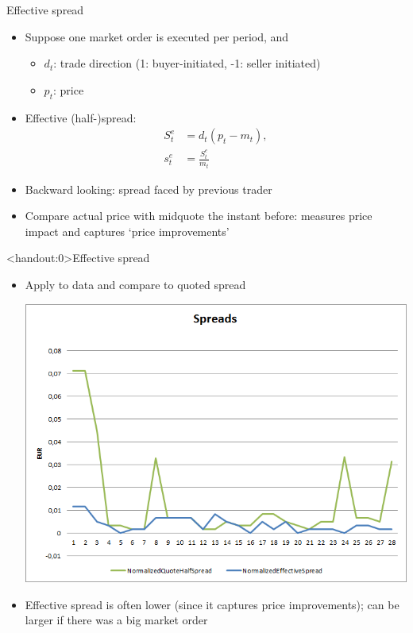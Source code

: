 \documentclass[english,10pt
,aspectratio=169
]{beamer}
\begin{document}
\begin{frame}{Effective spread}
	\begin{itemize}
		\item Suppose one market order is executed per period, and
		\begin{itemize}
			\item $d_t$: trade direction (1: buyer-initiated, -1: seller initiated)
			\item $p_t$:  price
		\end{itemize}
		\item \alert{Effective (half-)spread}: 
		\begin{align*}
		S^e_t & = d_t(p_t-m_{t}), \\
		s^e_t & = \frac{S^e_t}{m_{t}}
		\end{align*}
		\item Backward looking: spread faced by previous trader
		\item Compare actual price with midquote the instant before: measures price impact and captures `price improvements'
	\end{itemize}
\end{frame}


\begin{frame}<handout:0>{Effective spread}
	\begin{itemize}
		\item Apply to data and compare to quoted spread
		\begin{center}
			\includegraphics[scale=0.39]{pics/L2_effectivespread}
		\end{center}
		\item Effective spread is often lower (since it captures price improvements); can be larger if there was a big market order
	\end{itemize}
\end{frame}
\end{document}
